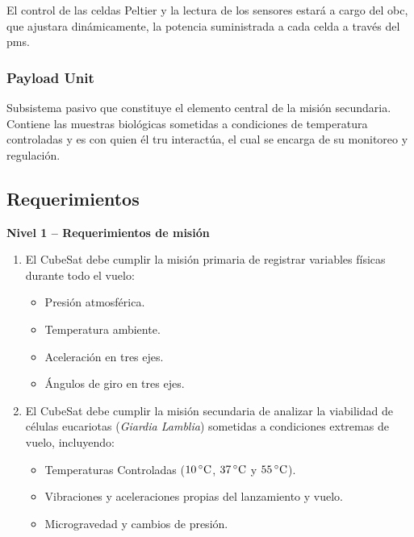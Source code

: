   El control de las celdas Peltier y la lectura de los sensores estará a cargo del \acrshort{obc}, que ajustara
  dinámicamente, la potencia suministrada a cada celda a través del \acrshort{pms}.

  \subsubsection{Payload Unit}
    Subsistema pasivo que constituye el elemento central de la misión secundaria.
    Contiene las muestras biológicas sometidas a condiciones de temperatura controladas y es con quien él
    \acrshort{tru} interactúa, el cual se encarga de su monitoreo y regulación.

  \subsection{Requerimientos}
    \textbf{Nivel 1 – Requerimientos de misión}
    \begin{enumerate}
        \item El CubeSat debe cumplir la misión primaria de registrar variables físicas durante todo el vuelo:
        \begin{itemize}
            \item Presión atmosférica.
            \item Temperatura ambiente.
            \item Aceleración en tres ejes.
            \item Ángulos de giro en tres ejes.
        \end{itemize}
        \item El CubeSat debe cumplir la misión secundaria de analizar la viabilidad de células eucariotas
          (\textit{Giardia Lamblia}) sometidas a condiciones extremas de vuelo, incluyendo:
        \begin{itemize}
            \item Temperaturas Controladas ($10\,^\circ\mathrm{C}$, $37\,^\circ\mathrm{C}$ y $55\,^\circ\mathrm{C}$).
            \item Vibraciones y aceleraciones propias del lanzamiento y vuelo.
            \item Microgravedad y cambios de presión.
        \end{itemize}
    \end{enumerate}
    
